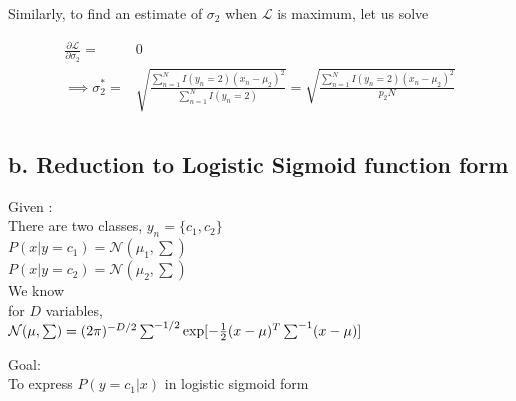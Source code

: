 \documentclass[letterpaper,doc,notimes]{apa6}
\begin{document}
{Similarly, to find an estimate of $\sigma_2$ when $\mathcal{L}$ is maximum, let us solve

\begin{align*}
\frac{\partial \mathcal{L} }{\partial \sigma_2} = &0  \\
\implies \sigma_2^* =& \sqrt{ \frac{ \sum_{n=1}^{N} I(y_n=2) (x_n - \mu_2)^2 }{\sum_{n=1}^{N} I(y_n=2)} } = \sqrt{ \frac{ \sum_{n=1}^{N} I(y_n=2) (x_n - \mu_2)^2 }{p_2 N} } \\
\end{align*}


\subsection{b. Reduction to Logistic Sigmoid function form}
Given :\\
\indent  There are two classes, $y_n = \{c_1, c_2\}$ \\
\indent  $P(x | y= c_1) = \mathcal{N}(\mu_1, \sum)$  \\
\indent  $P(x | y=c_2) = \mathcal{N}(\mu_2, \sum) $ \\

\noindent We know \\
\indent for $D$ variables, \\
\indent \indent $\mathcal{N}(\mu, \sum) = (2\pi)^{-D/2} \sum^{-1/2} \exp[-\frac{1}{2} (x-\mu)^T \space \sum^{-1} \space (x-\mu)]$

\noindent Goal: \\
\indent  To express $P(y=c_1|x) $ in logistic sigmoid form

}
\end{document}
